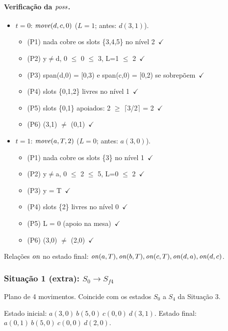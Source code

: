\paragraph{Verificação da $\mathit{poss}$.}\begin{itemize}
\item $t=0$: $\mathit{move}(d,c,0)$ ($L=1$; antes: $d(3,1)$).
\begin{itemize}
\item (P1) nada cobre os slots \{3,4,5\} no nível 2\ $\checkmark$
\item (P2) y$\neq$d, 0 $\le$ 0 $\le$ 3, L=1 $\le$ 2\ $\checkmark$
\item (P3) span(d,0) = [0,3) e span(c,0) = [0,2) se sobrepõem\ $\checkmark$
\item (P4) slots \{0,1,2\} livres no nível 1\ $\checkmark$
\item (P5) slots \{0,1\} apoiados: 2 $\ge$ $\lceil$3/2$\rceil$ = 2\ $\checkmark$
\item (P6) (3,1) $\neq$ (0,1)\ $\checkmark$
\end{itemize}
\item $t=1$: $\mathit{move}(a,T,2)$ ($L=0$; antes: $a(3,0)$).
\begin{itemize}
\item (P1) nada cobre os slots \{3\} no nível 1\ $\checkmark$
\item (P2) y$\neq$a, 0 $\le$ 2 $\le$ 5, L=0 $\le$ 2\ $\checkmark$
\item (P3) y = T\ $\checkmark$
\item (P4) slots \{2\} livres no nível 0\ $\checkmark$
\item (P5) L = 0 (apoio na mesa)\ $\checkmark$
\item (P6) (3,0) $\neq$ (2,0)\ $\checkmark$
\end{itemize}
\end{itemize}
Relações $\mathit{on}$ no estado final: $\mathit{on}(a,T), \mathit{on}(b,T), \mathit{on}(c,T), \mathit{on}(d,a), \mathit{on}(d,c)$.

\subsubsection{Situação 1 (extra): $S_0\to S_{f4}$}
Plano de 4 movimentos. Coincide com os estados $S_0$ a $S_4$ da Situação 3.

Estado inicial: $a(3,0)\ b(5,0)\ c(0,0)\ d(3,1)$. Estado final: $a(0,1)\ b(5,0)\ c(0,0)\ d(2,0)$.

